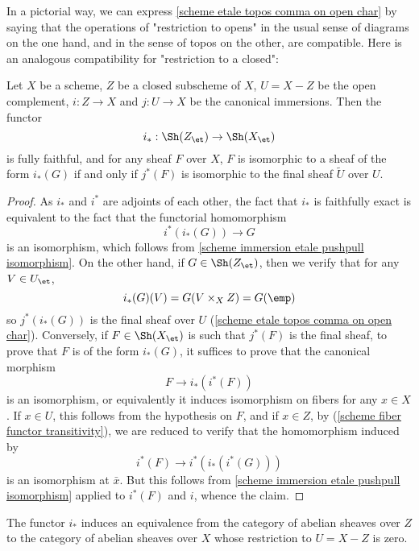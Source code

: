 In a pictorial way, we can express \cref{scheme etale topos comma on open char} by saying that the operations of "restriction to opens" in the usual sense of diagrams on the one hand, and in the sense of topos on the other, are compatible. Here is an analogous compatibility for "restriction to a closed":
\begin{theorem}\label{scheme closed immersion etale topos restriciton prop}
Let $X$ be a scheme, $Z$ be a closed subscheme of $X$, $U=X-Z$ be the open complement, $i:Z\to X$ and $j:U\to X$ be the canonical immersions. Then the functor
\[i_*:\Sh(Z_\et)\to\Sh(X_\et)\]
is fully faithful, and for any sheaf $F$ over $X$, $F$ is isomorphic to a sheaf of the form $i_*(G)$ if and only if $j^*(F)$ is isomorphic to the final sheaf $\widetilde{U}$ over $U$.
\end{theorem}
\begin{proof}
As $i_*$ and $i^*$ are adjoints of each other, the fact that $i_*$ is faithfully exact is equivalent to the fact that the functorial homomorphism
\[i^*(i_*(G))\to G\]
is an isomorphism, which follows from \cref{scheme immersion etale pushpull isomorphism}. On the other hand, if $G\in\Sh(Z_\et)$, then we verify that for any $V\in U_\et$,
\[i_*(G)(V)=G(V\times_XZ)=G(\emp)\]
so $j^*(i_*(G))$ is the final sheaf over $U$ (\cref{scheme etale topos comma on open char}). Conversely, if $F\in\Sh(X_\et)$ is such that $j^*(F)$ is the final sheaf, to prove that $F$ is of the form $i_*(G)$, it suffices to prove that the canonical morphism
\[F\to i_*(i^*(F))\]
is an isomorphism, or equivalently it induces isomorphism on fibers for any $x\in X$. If $x\in U$, this follows from the hypothesis on $F$, and if $x\in Z$, by (\ref{scheme fiber functor transitivity}), we are reduced to verify that the homomorphism induced by
\[i^*(F)\to i^*(i_*(i^*(G)))\]
is an isomorphism at $\bar{x}$. But this follows from \cref{scheme immersion etale pushpull isomorphism} applied to $i^*(F)$ and $i$, whence the claim.
\end{proof}

\begin{corollary}\label{scheme closed immersion etale topos char}
The functor $i_*$ induces an equivalence from the category of abelian sheaves over $Z$ to the category of abelian sheaves over $X$ whose restriction to $U=X-Z$ is zero.
\end{corollary}

